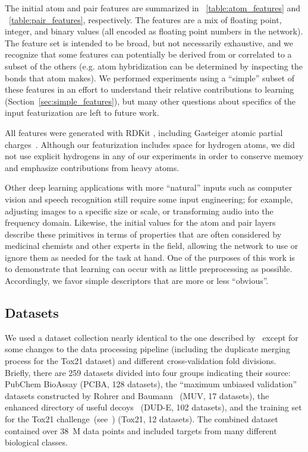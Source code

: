 The initial atom and pair features are summarized in
\tablename~\ref{table:atom_features} and \tablename~\ref{table:pair_features},
respectively. The features are a mix of floating point, integer, and binary
values (all encoded as floating point numbers in the network). The feature set
is intended to be broad, but not necessarily exhaustive, and we recognize that
some features can potentially be derived from or correlated to a subset of the
others (e.g. atom hybridization can be determined by inspecting the
bonds that atom makes). We performed experiments using a ``simple'' subset of
these features in an effort to understand their relative contributions to
learning (Section~\ref{sec:simple_features}), but many other questions about
specifics of the input featurization are left to future work.

All features were generated with RDKit \citep{landrumrdkit}, including Gasteiger
atomic partial charges~\citep{gasteiger1980iterative}. Although our
featurization includes space for hydrogen atoms, we did not use explicit
hydrogens in any of our experiments in order to conserve memory and emphasize
contributions from heavy atoms.

Other deep learning applications with more ``natural'' inputs such as computer
vision and speech recognition still require some input engineering; for example,
adjusting images to a specific size or scale, or transforming audio into the
frequency domain.  Likewise, the initial values for the atom and pair layers
describe these primitives in terms of properties that are often considered by
medicinal chemists and other experts in the field, allowing the network to use
or ignore them as needed for the task at hand. One of the purposes of this work
is to demonstrate that learning can occur with as little preprocessing as
possible. Accordingly, we favor simple descriptors that are more or less
``obvious''.

\subsection{Datasets}
\label{sec:graphconv_datasets}

We used a dataset collection nearly identical to the one described
by~\citet{ramsundar2015massively} except for some changes to the data
processing pipeline (including the duplicate merging process for the Tox21
dataset) and different cross-validation fold divisions. Briefly, there are 259
datasets divided into four groups indicating their source: PubChem BioAssay
\citep{wang2012pubchem} (PCBA, 128 datasets), the ``maximum unbiased
validation''
datasets constructed by Rohrer and Baumann~\citep{rohrer2009maximum} (MUV, 17
datasets), the enhanced directory of useful decoys~\citep{mysinger2012directory}
(DUD-E, 102 datasets), and the training set for the Tox21
challenge~(see~\citet{mayr2015deeptox}) (Tox21, 12 datasets). The combined
dataset
contained over 38~M data points and included targets from many different
biological classes.

